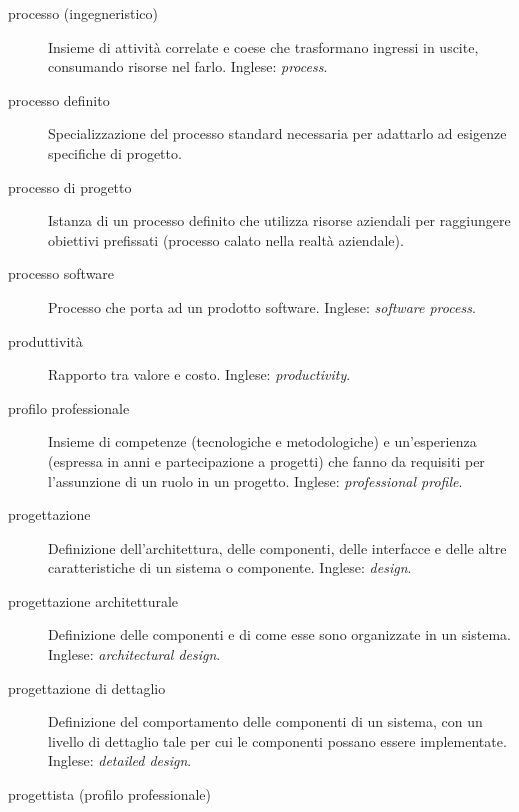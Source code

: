 \documentclass[a4paper]{article}
\begin{document}
\begin{description}
	\item[processo (ingegneristico)] 

			Insieme di attività correlate e coese che trasformano ingressi in uscite, consumando risorse nel farlo. Inglese: \emph{process}.
			
	\item[processo definito] 

			Specializzazione del processo standard necessaria per adattarlo ad esigenze specifiche di progetto.
			
	\item[processo di progetto] 

			Istanza di un processo definito che utilizza risorse aziendali per raggiungere obiettivi prefissati (processo calato nella realtà aziendale).
			
	\item[processo software] 

			Processo che porta ad un prodotto software. Inglese: \emph{software process}.
			
	\item[produttività] 

			Rapporto tra valore e costo. Inglese: \emph{productivity}.
			
	\item[profilo professionale] 

			Insieme di competenze (tecnologiche e metodologiche) e un'esperienza (espressa in anni e partecipazione a progetti) che fanno da requisiti per l'assunzione di un ruolo in un progetto. Inglese: \emph{professional profile}.
			
	\item[progettazione] 

			Definizione dell'architettura, delle componenti, delle interfacce e delle altre caratteristiche di un sistema o componente. Inglese: \emph{design}.
			
	\item[progettazione architetturale] 

			Definizione delle componenti e di come esse sono organizzate in un sistema. Inglese: \emph{architectural design}.
			
	\item[progettazione di dettaglio] 

			Definizione del comportamento delle componenti di un sistema, con un livello di dettaglio tale per cui le componenti possano essere implementate. Inglese: \emph{detailed design}.
			
	\item[progettista (profilo professionale)] 


\end{description}
\end{document}
